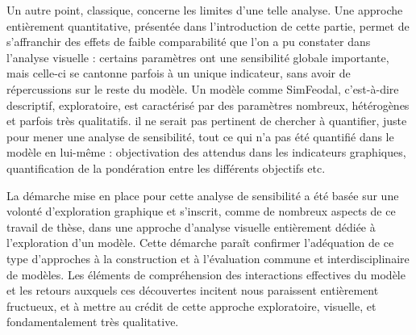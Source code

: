 Un autre point, classique, concerne les limites d'une telle analyse.
Une approche entièrement quantitative, présentée dans l'introduction de cette partie, permet de s'affranchir des effets de faible comparabilité que l'on a pu constater dans l'analyse visuelle : certains paramètres ont une sensibilité globale importante, mais celle-ci se cantonne parfois à un unique indicateur, sans avoir de répercussions sur le reste du modèle.
Un modèle comme SimFeodal, c'est-à-dire descriptif, exploratoire, est caractérisé par des paramètres nombreux, hétérogènes et parfois très qualitatifs.
il ne serait pas pertinent de chercher à quantifier, juste pour mener une analyse de sensibilité, tout ce qui n'a pas été quantifié dans le modèle en lui-même : objectivation des attendus dans les indicateurs graphiques, quantification de la pondération entre les différents objectifs etc.

La démarche mise en place pour cette analyse de sensibilité a été basée sur une volonté d'exploration graphique et s'inscrit, comme de nombreux aspects de ce travail de thèse, dans une approche d'analyse visuelle entièrement dédiée à l'exploration d'un modèle.
Cette démarche paraît confirmer l'adéquation de ce type d'approches à la construction et à l'évaluation commune et interdisciplinaire de modèles.
Les éléments de compréhension des interactions effectives du modèle et les retours auxquels ces découvertes incitent nous paraissent entièrement fructueux, et à mettre au crédit de cette approche exploratoire, visuelle, et fondamentalement très qualitative.


